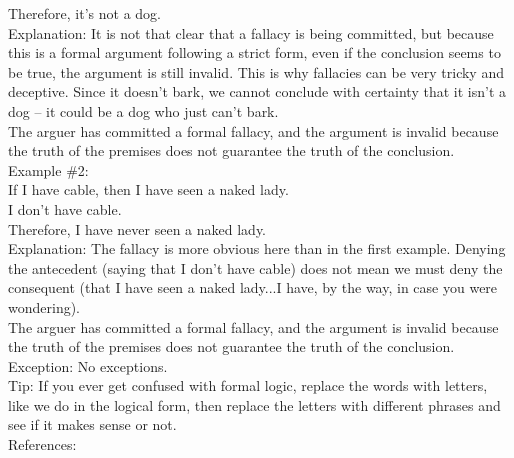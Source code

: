 \documentclass[a4paper,12pt,single,pdftex]{scrartcl}
\begin{document}
    
      Therefore, it’s not a dog.
    \\

    
      Explanation: It is not that clear that a fallacy is being committed, but because this is a formal argument following a strict form, even if the conclusion seems to be true, the argument is still invalid.  This is why fallacies can be very tricky and deceptive.  Since it doesn’t bark, we cannot conclude with certainty that it isn’t a dog -- it could be a dog who just can’t bark.
    \\

    
      The arguer has committed a formal fallacy, and the argument is invalid because the truth of the premises does not guarantee the truth of the conclusion.
    \\

    
      Example \#2:
    \\

    
      If I have cable, then I have seen a naked lady.
    \\

    
      I don’t have cable.
    \\

    
      Therefore, I have never seen a naked lady.
    \\

    
      Explanation: The fallacy is more obvious here than in the first example. Denying the antecedent (saying that I don’t have cable) does not mean we must deny the consequent (that I have seen a naked lady...I have, by the way, in case you were wondering).
    \\

    
      The arguer has committed a formal fallacy, and the argument is invalid because the truth of the premises does not guarantee the truth of the conclusion.
    \\

    
      Exception: No exceptions.
    \\

    
      Tip: If you ever get confused with formal logic, replace the words with letters, like we do in the logical form, then replace the letters with different phrases and see if it makes sense or not.
    \\

    References:

    
      
        
      \\
\end{document}
